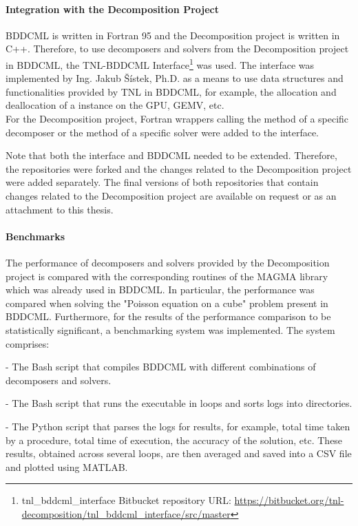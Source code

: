 \paragraph{Integration with the Decomposition Project} BDDCML is written in Fortran 95 and the Decomposition project is written in C++.
Therefore, to use decomposers and solvers from the Decomposition project in BDDCML, the TNL-BDDCML Interface\footnote{tnl\_bddcml\_interface Bitbucket repository URL: \url{https://bitbucket.org/tnl-decomposition/tnl_bddcml_interface/src/master}} was used.
The interface was implemented by Ing.
Jakub Šístek, Ph.D. as a means to use data structures and functionalities provided by TNL in BDDCML, for example, the allocation and deallocation of a  instance on the GPU, GEMV, etc.\\
For the Decomposition project, Fortran wrappers calling the  method of a specific decomposer or the  method of a specific solver were added to the interface.

Note that both the interface and BDDCML needed to be extended.
Therefore, the repositories were forked and the changes related to the Decomposition project were added separately.
The final versions of both repositories that contain changes related to the Decomposition project are available on request or as an attachment to this thesis.

\paragraph{Benchmarks} The performance of decomposers and solvers provided by the Decomposition project is compared with the corresponding routines of the MAGMA library \cite{Tomov2010} which was already used in BDDCML.
In particular, the performance was compared when solving the "Poisson equation on a cube" problem present in BDDCML.
Furthermore, for the results of the performance comparison to be statistically significant, a benchmarking system was implemented.
The system comprises:

\begin{tight_itemize}
	\item {} - The Bash script that compiles BDDCML with different combinations of decomposers and solvers.
	\item {} - The Bash script that runs the  executable in loops and sorts logs into directories.
	\item {} - The Python script that parses the logs for results, for example, total time taken by a procedure, total time of execution, the accuracy of the solution, etc.
These results, obtained across several loops, are then averaged and saved into a CSV file and plotted using MATLAB.
\end{tight_itemize}